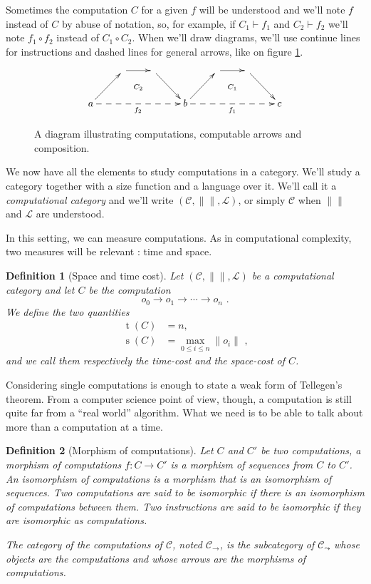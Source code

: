 \documentclass{article}
\newcommand{\cat}[1]{\mathscr{#1}}
\newcommand{\C}{\cat{C}}
\renewcommand{\L}{\cat{L}}
\newcommand{\comp}{\circ}
\newcommand{\size}[1]{\lVert#1\rVert}
\newcommand{\ra}{\rightarrow}
\DeclareMathOperator{\Time}{t}
\DeclareMathOperator{\Space}{s}
\newcommand{\computes}{\vdash}
\newtheorem{definition}{Definition}
\begin{document}
  Sometimes the computation $C$ for a given $f$ will be understood and
  we'll note $f$ instead of $C$ by abuse of notation, so, for example,
  if $C_1\computes f_1$ and $C_2\computes f_2$ we'll note $f_1\comp
  f_2$ instead of $C_1\comp C_2$. When we'll draw diagrams, we'll use
  continue lines for instructions and dashed lines for general arrows,
  like on figure \ref{fig:comp}.
  \begin{figure}[!h]
    \[\xymatrix{
      & \ar[r]\ar@{}[dr]|{C_2} & \ar[dr] &
      & \ar[r]\ar@{}[dr]|{C_1} & \ar[dr] \\
      a \ar[ur]\ar@{-->}[rrr]_{f_2} &&& b
      \ar[ur]\ar@{-->}[rrr]_{f_1} &&& c
    }\]
    \caption{\label{fig:comp}A diagram illustrating computations,
    computable arrows and composition.}
  \end{figure}
  
  We now have all the elements to study computations in a
  category. We'll study a category together with a size function and a
  language over it. We'll call it a \emph{computational category} and
  we'll write $(\C, \size{}, \L)$, or simply $\C$ when $\size{}$ and
  $\L$ are understood.

  In this setting, we can measure computations. As in computational
  complexity, two measures will be relevant : time and space.

  \begin{definition}[Space and time cost]
    Let $(\C, \size{}, \L)$ be a computational category and let $C$ be
    the computation
    \[o_0 \ra o_1 \ra \cdots \ra o_n \text{ .}\]
    We define the two quantities
    \begin{align*}
      \Time(C) &= n \text{,} \\
      \Space(C) &= \max_{0\le i \le n} \size{o_i} \text{ ,}
    \end{align*}
    and we call them respectively the \emph{time-cost} and the
    \emph{space-cost} of $C$.
  \end{definition}

  Considering single computations is enough to state a weak form of
  Tellegen's theorem. From a computer science point of view, though, a
  computation is still quite far from a ``real world'' algorithm. What
  we need is to be able to talk about more than a computation at a
  time.

  \begin{definition}[Morphism of computations]
    Let $C$ and $C'$ be two computations, a \emph{morphism of
      computations} $f:C\ra C'$ is a morphism of sequences from $C$ to
    $C'$. An \emph{isomorphism of computations} is a morphism that is
    an isomorphism of sequences. Two computations are said to be
    \emph{isomorphic} if there is an isomorphism of computations
    between them. Two instructions are said to be isomorphic if they
    are isomorphic as computations.

    The category of the computations of $\C$, noted $\C_\ra$, is the
    subcategory of $\C_\leadsto$ whose objects are the computations
    and whose arrows are the morphisms of computations.
  \end{definition}
\end{document}
